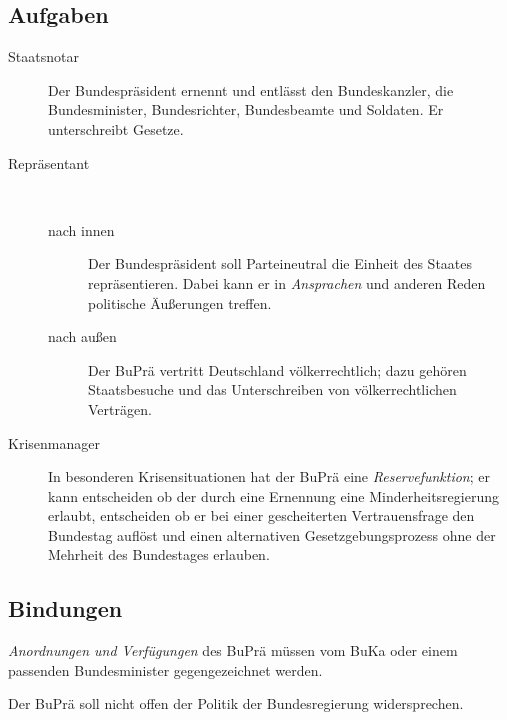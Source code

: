 \documentclass{article}
\begin{document}
\subsection{Aufgaben}
\begin{description}
 \item[Staatsnotar] Der Bundespräsident ernennt und entlässt den Bundeskanzler, die Bundesminister, Bundesrichter, Bundesbeamte und Soldaten. Er unterschreibt Gesetze.
 \item[Repräsentant]~
 \begin{description}
  \item[nach innen] Der Bundespräsident soll Parteineutral die Einheit des Staates repräsentieren. Dabei kann er in \emph{Ansprachen} und anderen Reden politische Äußerungen treffen. 
  \item[nach außen] Der BuPrä vertritt Deutschland völkerrechtlich; dazu gehören Staatsbesuche und das Unterschreiben von völkerrechtlichen Verträgen.
 \end{description}
 \item[Krisenmanager] In besonderen Krisensituationen hat der BuPrä eine \emph{Reservefunktion}; er kann entscheiden ob der durch eine Ernennung eine Minderheitsregierung erlaubt, entscheiden ob er bei einer gescheiterten Vertrauensfrage den Bundestag auflöst und einen alternativen Gesetzgebungsprozess ohne der Mehrheit des Bundestages erlauben. 
\end{description}

\subsection{Bindungen}
\emph{Anordnungen und Verfügungen} des BuPrä müssen vom BuKa oder einem passenden Bundesminister gegengezeichnet werden.

Der BuPrä soll nicht offen der Politik der Bundesregierung widersprechen.
\end{document}
